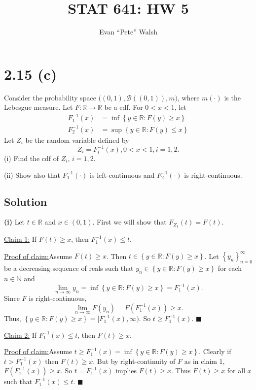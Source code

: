 \documentclass[12pt]{article}
\title{STAT 641: HW 5}
\author{Evan ``Pete'' Walsh}
\newenvironment{claimproof}[1]{\par\noindent\underline{Proof of claim:}\space#1}{\hfill $\blacksquare$\vspace{5mm}}
\begin{document}
\maketitle

\section*{2.15 (c)}
Consider the probability space $\big( (0,1), \mathcal{B}\left( (0,1) \right), m\big)$, where $m(\cdot)$ is the Lebesgue measure. Let $F : \mathbb{R}
\rightarrow \mathbb{R}$ be a cdf. For $0 < x < 1$, let 
\begin{align*}
F_{1}^{-1}(x) & = \inf\left\{ y \in \mathbb{R} : F(y) \geq x \right\} \\
F_{2}^{-1}(x) & = \sup\left\{ y \in \mathbb{R} : F(y) \leq x \right\}
\end{align*}
Let $Z_{i}$ be the random variable defined by 
\[ Z_{i} = F_{i}^{-1}(x), 0 < x < 1, i = 1,2. \]
(i) Find the cdf of $Z_{i}$, $i = 1,2$.

(ii) Show also that $F_{1}^{-1}(\cdot)$ is left-continuous and $F_{2}^{-1}(\cdot)$ is right-continuous.

\subsection*{Solution}

{\bf (i)} Let $t \in \mathbb{R}$ and $x \in (0,1)$. First we will show that $F_{Z_{1}}(t) = F(t)$.

\underline{Claim 1:} If $F(t) \geq x$, then $F_{1}^{-1}(x) \leq t$.
\begin{claimproof}
Assume $F(t) \geq x$. Then $t \in \left\{ y \in \mathbb{R} : F(y) \geq x \right\}$. Let $\left\{ y_{n} \right\}_{n=0}^{\infty}$ be a decreasing
sequence of reals such that $y_{n} \in \left\{ y \in \mathbb{R} : F(y) \geq x \right\}$ for each $n \in \mathbb{N}$ and 
\[ \lim_{n\rightarrow \infty} y_{n} = \inf\left\{ y \in \mathbb{R} : F(y) \geq x \right\} = F_{1}^{-1}(x).\] 
Since $F$ is right-continuous, 
\[ \lim_{n\rightarrow\infty}F(y_{n}) = F(F_{1}^{-1}(x)) \geq x. \]
Thus, $\left\{ y \in \mathbb{R} : F(y) \geq x \right\} = [F_{1}^{-1}(x), \infty)$. So $t \geq F_{1}^{-1}(x)$.
\end{claimproof}

\underline{Claim 2:} If $F_{1}^{-1}(x) \leq t$, then $F(t) \geq x$.
\begin{claimproof}
Assume $t \geq F_{1}^{-1}(x) = \inf\left\{ y \in \mathbb{R} : F(y) \geq x \right\}$. Clearly if $t > F_{1}^{-1}(x)$ then $F(t) \geq x$. But by
right-continuity of $F$ as in claim 1, $F(F_{1}^{-1}(x)) \geq x$. So $t = F_{1}^{-1}(x)$ implies $F(t) \geq x$. Thus $F(t) \geq x$ for all $x$ such
that $F_{1}^{-1}(x) \leq t$.
\end{claimproof}
\end{document}

